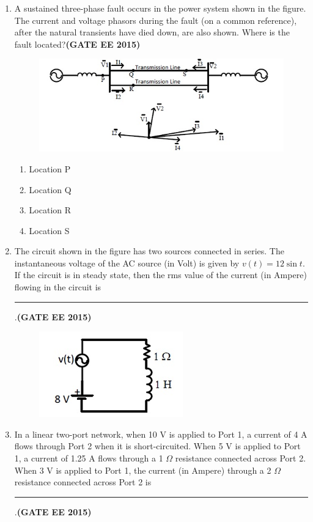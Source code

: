 \documentclass[a4paper,12pt]{exam}
\theoremstyle{remark}
\begin{document}
\begin{enumerate}
\item A sustained three-phase fault occurs in the power system shown in the figure. The current and voltage phasors during the fault (on a common reference), after the natural transients have died down, are also shown. Where is the fault located?\hfill{\textbf{(GATE EE 2015)}}
\begin{figure}[H]
    \centering
    \includegraphics[width=0.7\columnwidth]{figs/Q 54.png}
    \caption{}
    \label{fig:placeholder}
\end{figure}
\begin{multicols}{4}
    \begin{enumerate}
        \item Location P
        \item Location Q
        \item Location R
        \item Location S
    \end{enumerate}
\end{multicols}
\item The circuit shown in the figure has two sources connected in series. The instantaneous voltage of the AC source (in Volt) is given by $v(t) = 12\sin t$. If the circuit is in steady state, then the rms value of the current (in Ampere) flowing in the circuit is \rule{3cm}{0.15mm}.\hfill{\textbf{(GATE EE 2015)}}
\begin{figure}[H]
    \centering
    \includegraphics[width=0.5\columnwidth]{figs/Q 55.png}
    \caption{}
    \label{fig:placeholder}
\end{figure}
\item In a linear two-port network, when 10 V is applied to Port 1, a current of 4 A flows through Port 2 when it is short-circuited. When 5 V is applied to Port 1, a current of 1.25 A flows through a 1 $\Omega$ resistance connected across Port 2. When 3 V is applied to Port 1, the current (in Ampere) through a 2 $\Omega$ resistance connected across Port 2 is \rule{3cm}{0.15mm}.\hfill{\textbf{(GATE EE 2015)}}


\end{enumerate}
\end{document}
